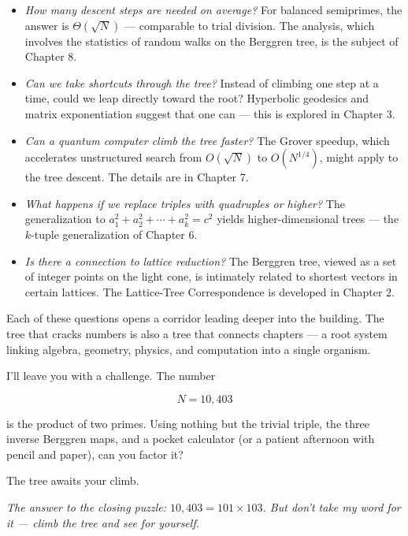 \documentclass[11pt,twoside,openright]{book}
\theoremstyle{definition}
\theoremstyle{remark}
\begin{document}
\begin{itemize}
  \item \textit{How many descent steps are needed on average?} For balanced semiprimes, the answer is $\Theta(\sqrt{N})$ --- comparable to trial division. The analysis, which involves the statistics of random walks on the Berggren tree, is the subject of Chapter 8.

  \item \textit{Can we take shortcuts through the tree?} Instead of climbing one step at a time, could we leap directly toward the root? Hyperbolic geodesics and matrix exponentiation suggest that one can --- this is explored in Chapter 3.

  \item \textit{Can a quantum computer climb the tree faster?} The Grover speedup, which accelerates unstructured search from $O(\sqrt{N})$ to $O(N^{1/4})$, might apply to the tree descent. The details are in Chapter 7.

  \item \textit{What happens if we replace triples with quadruples or higher?} The generalization to $a_1^2 + a_2^2 + \cdots + a_k^2 = c^2$ yields higher-dimensional trees --- the $k$-tuple generalization of Chapter 6.

  \item \textit{Is there a connection to lattice reduction?} The Berggren tree, viewed as a set of integer points on the light cone, is intimately related to shortest vectors in certain lattices. The Lattice-Tree Correspondence is developed in Chapter 2.
\end{itemize}

Each of these questions opens a corridor leading deeper into the building. The tree that cracks numbers is also a tree that connects chapters --- a root system linking algebra, geometry, physics, and computation into a single organism.

I'll leave you with a challenge. The number

\[N = 10{,}403\]

is the product of two primes. Using nothing but the trivial triple, the three inverse Berggren maps, and a pocket calculator (or a patient afternoon with pencil and paper), can you factor it?

The tree awaits your climb.




\textit{The answer to the closing puzzle: $10{,}403 = 101 \times 103$. But don't take my word for it --- climb the tree and see for yourself.}
\end{document}
